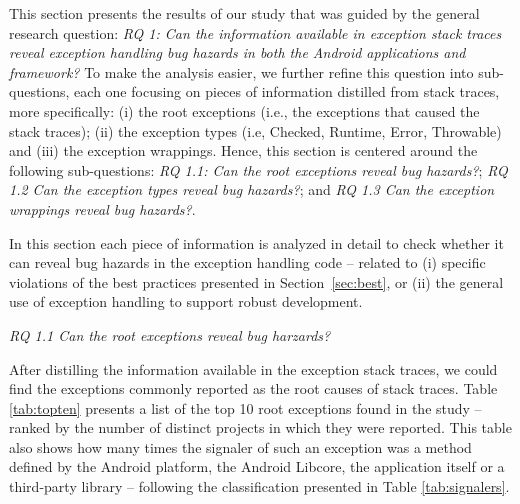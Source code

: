 This section presents the results of our study that was guided by the general research question:
 \emph{RQ 1: Can the information available in exception stack traces reveal exception handling 
bug hazards in both the Android applications and framework?}
To make the analysis easier, we further refine this question into sub-questions, each one focusing on pieces of information
 distilled from stack traces, more specifically: (i) the root exceptions (i.e., the exceptions that caused the stack traces);
 (ii) the exception types (i.e, Checked, Runtime, Error, Throwable) and (iii) the exception wrappings. 
Hence, this section is centered around the following sub-questions:  \emph{RQ 1.1: Can the root exceptions reveal bug hazards?}; 
 \emph{RQ 1.2 Can the exception types reveal bug hazards?}; and  \emph{RQ 1.3 Can the exception wrappings reveal bug hazards?}.

In this section each piece of information is analyzed in detail to 
check whether it can reveal bug hazards in the exception handling code --
related to (i) specific violations of the best practices presented in Section~\ref{sec:best},
or (ii) the general use of exception handling to support robust development.

 
\bigskip

\noindent\emph{RQ 1.1 Can the root exceptions reveal bug harzards?}

\bigskip

After distilling the information available in the exception stack traces, we could find 
the exceptions commonly reported as the root causes of stack traces.
Table \ref{tab:topten} presents a list of the top 10 root exceptions found in the study -- 
 ranked by the number of distinct projects in which they were reported. 
This table also shows how many times the signaler of such an exception was a method defined by
the Android platform, the Android Libcore, the application itself or a third-party library --
 following the classification presented in Table  \ref{tab:signalers}. 

